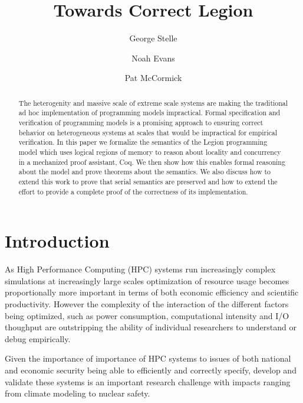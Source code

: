 \documentclass[sigconf]{acmart}
\begin{document}
\title{Towards Correct Legion}
\author{George Stelle}

\author{Noah Evans}

\author{Pat McCormick}

\begin{abstract}
The heterogenity and massive scale of extreme scale systems are making the
traditional ad hoc implementation of programming models impractical. Formal
specification and verification of programming models is a promising approach to
ensuring correct behavior on heterogeneous systems at scales that would be
impractical for empirical verification. In this paper we formalize the semantics
of the Legion programming model which uses logical regions of memory to reason about 
locality and concurrency in a mechanized
proof assistant, Coq. We then show how this enables formal reasoning about the
model and
prove theorems about the semantics. We also discuss how to extend this work to
prove that serial semantics are preserved and how to extend the effort to
provide a complete proof of the correctness of its implementation.
\end{abstract}

\maketitle

\section{Introduction}
As High Performance Computing (HPC) systems run increasingly complex simulations at
increasingly large scales optimization of resource usage becomes proportionally
more important in terms of both economic efficiency and scientific productivity. However the complexity of the interaction of the different
factors being optimized, such as power consumption, computational intensity and
I/O thoughput are outstripping the ability of individual researchers to understand or debug empirically.

Given the importance of importance of HPC systems to issues of both national and
economic security being able to efficiently and correctly specify, develop and
validate these systems is an important research challenge with impacts 
ranging from climate modeling to nuclear safety.
\end{document}

